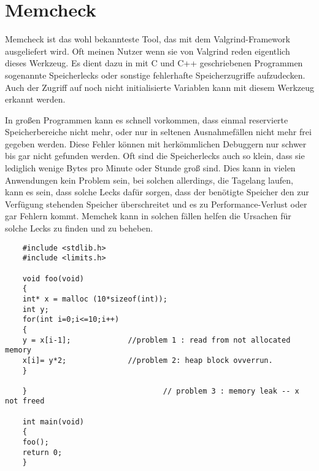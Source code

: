 \section{Memcheck}
Memcheck ist das wohl bekannteste Tool, das mit dem Valgrind-Framework ausgeliefert wird. Oft meinen Nutzer wenn sie von Valgrind reden eigentlich dieses Werkzeug. Es dient dazu in mit C und C++ geschriebenen Programmen sogenannte Speicherlecks oder sonstige fehlerhafte Speicherzugriffe aufzudecken. Auch der Zugriff auf noch nicht initialisierte Variablen kann mit diesem Werkzeug erkannt werden.

In großen Programmen kann es schnell vorkommen, dass einmal reservierte Speicherbereiche nicht mehr, oder nur in seltenen Ausnahmefällen nicht mehr frei gegeben werden. Diese Fehler können mit herkömmlichen Debuggern nur schwer bis gar nicht gefunden werden. Oft sind die Speicherlecks auch so klein, dass sie lediglich wenige Bytes pro Minute oder Stunde groß sind. Dies kann in vielen Anwendungen kein Problem sein, bei solchen allerdings, die Tagelang laufen, kann es sein, dass solche Lecks dafür sorgen, dass der benötigte Speicher den zur Verfügung stehenden Speicher überschreitet und es zu Performance-Verlust oder gar Fehlern kommt. Memchek kann in solchen fällen helfen die Ursachen für solche Lecks zu finden und zu beheben.

\begin{lstlisting}
	#include <stdlib.h>
	#include <limits.h>
	
	void foo(void)
	{
	int* x = malloc (10*sizeof(int));
	int y;
	for(int i=0;i<=10;i++) 
	{
	y = x[i-1]; 			//problem 1 : read from not allocated memory
	x[i]= y*2;  			//problem 2: heap block ovverrun.
	}
	
	}								// problem 3 : memory leak -- x not freed
	
	int main(void)
	{
	foo();
	return 0;
	}
\end{lstlisting}